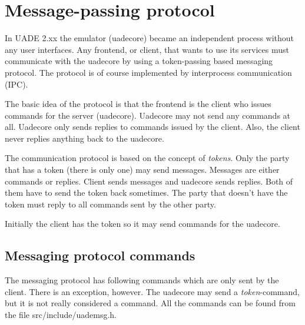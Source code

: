 \documentclass{article}
\begin{document}
\section{Message-passing protocol}
In UADE 2.xx the emulator (uadecore) became an independent process without
any user interfaces. Any frontend, or client, that wants to use its services
must communicate with the uadecore by using a token-passing based messaging
protocol. The protocol is of course implemented by interprocess communication
(IPC).

The basic idea of the protocol is that the frontend is the client
who issues commands for the server (uadecore). Uadecore may not send any
commands at all. Uadecore only sends replies to commands issued by the
client. Also, the client never replies anything back to the
uadecore.

The communication protocol is based on the concept of
\emph{tokens}. Only the party that has a token (there is only one) may
send messages. Messages are either commands or replies. Client sends
messages and uadecore sends replies. Both of them have to send the token back
sometimes. The party that doesn't have the token must reply to all commands
sent by the other party.

Initially the client has the token so it may send commands for the uadecore.

\subsection{Messaging protocol commands}

The messaging protocol has following commands which are only sent by
the client. There is an exception, however. The uadecore may send a
\emph{token}-command, but it is not really considered a command.
All the commands can be found from the file \mbox{src/include/uademsg.h}.
\end{document}
